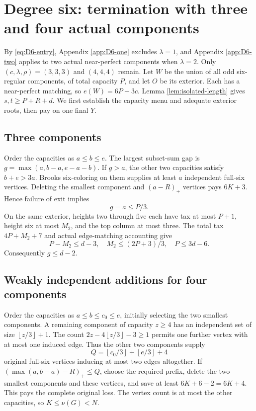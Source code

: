 \documentclass[11pt,a4paper]{article}
\newcommand{\floor}[1]{\left\lfloor#1\right\rfloor}
\theoremstyle{definition}
\begin{document}
\section{Degree six: termination with three and four actual components}\label{app:D6-three-four}
By \eqref{eq:D6-entry}, Appendix \ref{app:D6-one} excludes $\lambda=1$, and Appendix \ref{app:D6-two} applies to two actual near-perfect components when $\lambda=2$. Only $(c,\lambda,\rho)=(3,3,3)$ and $(4,4,4)$ remain. Let $W$ be the union of all odd six-regular components, of total capacity $P$, and let $O$ be its exterior. Each has a near-perfect matching, so $e(W)=6P+3c$. Lemma \ref{lem:isolated-length} gives $s,t\ge P+R+d$. We first establish the capacity menu and adequate exterior roots, then pay on one final $Y$.

\subsection{Three components}
Order the capacities as $a\le b\le e$. The largest subset-sum gap is $g=\max(a,b-a,e-a-b)$. If $g>a$, the other two capacities satisfy $b+e>3a$. Brooks six-coloring on them supplies at least $a$ independent full-six vertices. Deleting the smallest component and $(a-R)_+$ vertices pays $6K+3$. Hence failure of exit implies
\[
 g=a\le P/3.
\]
On the same exterior, heights two through five each have tax at most $P+1$, height six at most $M_2$, and the top column at most three. The total tax $4P+M_2+7$ and actual edge-matching accounting give
\[
 P-M_2\le d-3,\quad M_2\le(2P+3)/3,\quad P\le3d-6.
\]
Consequently $g\le d-2$.

\subsection{Weakly independent additions for four components}
Order the capacities as $a\le b\le c_0\le e$, initially selecting the two smallest components. A remaining component of capacity $z\ge4$ has an independent set of size $\floor{z/3}+1$. The count $2z-4\floor{z/3}-3\ge1$ permits one further vertex with at most one induced edge. Thus the other two components supply
\[
 Q=\floor{c_0/3}+\floor{e/3}+4
\]
original full-six vertices inducing at most two edges altogether. If $(\max(a,b-a)-R)_+\le Q$, choose the required prefix, delete the two smallest components and these vertices, and save at least $6K+6-2=6K+4$. This pays the complete original loss. The vertex count is at most the other capacities, so $K\le\nu(G)<N$.
\end{document}
